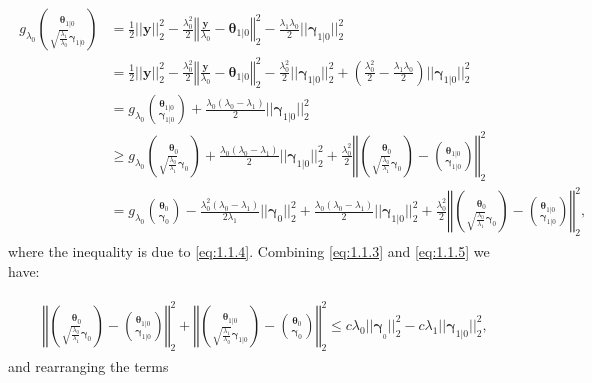 \begin{gather}
    \label{eq:1.1.5}
    \begin{aligned}
        g_{\lambda_0}\binom{\boldsymbol\theta_{1|0}}{\sqrt{\frac{\lambda_1}{\lambda_0}}\boldsymbol\gamma_{1|0}}&=\frac{1}{2}||\boldsymbol y||_2^2-\frac{\lambda_0^2}{2}\left\Vert\frac{\boldsymbol y}{\lambda_0}-\boldsymbol\theta_{1|0}\right\Vert_2^2-\frac{\lambda_1\lambda_0}{2}||\boldsymbol\gamma_{1|0}||_2^2\\
        &= \frac{1}{2}||\boldsymbol y||_2^2-\frac{\lambda_0^2}{2}\left\Vert\frac{\boldsymbol y}{\lambda_0}-\boldsymbol\theta_{1|0}\right\Vert_2^2-\frac{\lambda_0^2}{2}||\boldsymbol\gamma_{1|0}||_2^2+\left(\frac{\lambda_0^2}{2}-\frac{\lambda_1\lambda_0}{2}\right)||\boldsymbol\gamma_{1|0}||_2^2\\
        &=g_{\lambda_0}\binom{\boldsymbol\theta_{1|0}}{\boldsymbol\gamma_{1|0}}+\frac{\lambda_0(\lambda_0-\lambda_1)}{2}||\boldsymbol\gamma_{1|0}||_2^2\\
        &\geq g_{\lambda_0}\binom{\boldsymbol\theta_{0}}{\sqrt{\frac{\lambda_0}{\lambda_1}}\boldsymbol\gamma_{0}}+\frac{\lambda_0(\lambda_0-\lambda_1)}{2}||\boldsymbol\gamma_{1|0}||_2^2+\frac{\lambda_0^2}{2}\left\Vert\binom{\boldsymbol\theta_{0}}{\sqrt{\frac{\lambda_0}{\lambda_1}}\boldsymbol\gamma_{0}}-\binom{\boldsymbol\theta_{1|0}}{\boldsymbol\gamma_{1|0}}\right\Vert_2^2\\
        &=g_{\lambda_0}\binom{\boldsymbol\theta_{0}}{\boldsymbol\gamma_{0}}-\frac{\lambda_0^2(\lambda_0-\lambda_1)}{2\lambda_1}||\boldsymbol\gamma_{0}||_2^2+\frac{\lambda_0(\lambda_0-\lambda_1)}{2}||\boldsymbol\gamma_{1|0}||_2^2+\frac{\lambda_0^2}{2}\left\Vert\binom{\boldsymbol\theta_{0}}{\sqrt{\frac{\lambda_0}{\lambda_1}}\boldsymbol\gamma_{0}}-\binom{\boldsymbol\theta_{1|0}}{\boldsymbol\gamma_{1|0}}\right\Vert_2^2,
    \end{aligned}
\end{gather}
where the inequality is due to \eqref{eq:1.1.4}. Combining \eqref{eq:1.1.3} and \eqref{eq:1.1.5} we have:

\begin{gather}
    \begin{aligned}
        &\left\Vert\binom{\boldsymbol\theta_{0}}{\sqrt{\frac{\lambda_0}{\lambda_1}}\boldsymbol\gamma_{0}}-\binom{\boldsymbol\theta_{1|0}}{\boldsymbol\gamma_{1|0}}\right\Vert_2^2+\left\Vert\binom{\boldsymbol\theta_{1|0}}{\sqrt{\frac{\lambda_1}{\lambda_0}}\boldsymbol\gamma_{1|0}}-\binom{\boldsymbol\theta_{0}}{\boldsymbol\gamma_{0}}\right\Vert_2^2\leq c\lambda_0||\boldsymbol\gamma_{_0}||_2^2-c\lambda_1||\boldsymbol\gamma_{1|0}||_2^2,
    \end{aligned}
\end{gather}
and rearranging the terms

